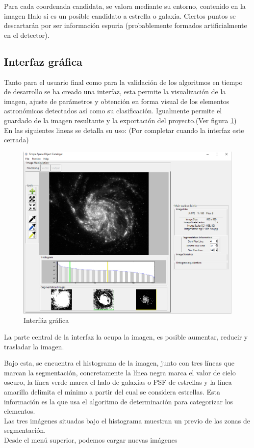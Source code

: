 	Para cada coordenada candidata, se valora mediante su entorno, contenido en la imagen Halo si es un posible candidato a estrella o galaxia. Ciertos puntos se descartarán por ser información espuria (probablemente formados artificialmente en el detector).
	
	
	\subsection{Interfaz gráfica}
	Tanto para el usuario final como para la validación de los algoritmos en tiempo de desarrollo se ha creado una interfaz, esta permite la visualización de la imagen, ajuste de parámetros y obtención en forma visual de los elementos astronómicos detectados así como su clasificación. Igualmente permite el guardado de la imagen resultante y la exportación del proyecto.(Ver figura \ref{fig:GUI_limpia})\\
	En las siguientes lineas se detalla su uso: (Por completar cuando la interfaz este cerrada)\\
	\begin{figure}[!htb]
		\centering
		\includegraphics[width=1\textwidth]{images/GUI.jpg}
		\caption{\label{fig:GUI_limpia}Interfáz gráfica}
	\end{figure}
	La parte central de la interfaz la ocupa la imagen, es posible aumentar, reducir y trasladar la imagen.
	
	Bajo esta, se encuentra el histograma de la imagen, junto con tres líneas que marcan la segmentación, concretamente la línea negra marca el valor de cielo oscuro, la línea verde marca el halo de galaxias o PSF de estrellas y la línea amarilla delimita el mínimo a partir del cual se considera estrellas. Esta información es la que usa el algoritmo de determinación para categorizar los elementos.\\
	Las tres imágenes situadas bajo el histograma muestran un previo de las zonas de segmentación.\\	
	Desde el menú superior, podemos cargar nuevas imágenes
